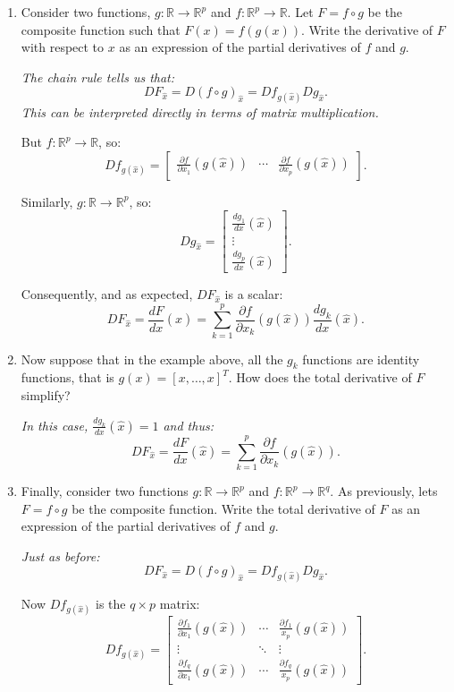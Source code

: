 \documentclass{article}
\newcommand{\R}{\ensuremath{\mathbb{R}}}
\begin{document}
\begin{enumerate}
	\item Consider two functions, $g:\R\rightarrow\R^p$ and $f:\R^p\rightarrow\R$. Let $F=f\circ g$ be the composite function such that $F(x)=f(g(x))$. Write the derivative of $F$ with respect to $x$ as an expression of the partial derivatives of $f$ and $g$.
	
	{\it The chain rule tells us that:
	$$DF_{\hat{x}} = D(f\circ g)_{\hat{x}} = Df_{g(\hat{x})} Dg_{\hat{x}}.$$
	This can be interpreted directly in terms of matrix multiplication.
	
	But $f:\R^p \rightarrow \R$, so:
	$$Df_{g(\hat{x})} = \left[\begin{array}{ccc}
	\frac{\partial f}{\partial x_1}(g(\hat{x})) &
	\cdots &
	\frac{\partial f}{\partial x_p}(g(\hat{x}))
	\end{array}\right].$$
	
	Similarly, $g:\R\rightarrow \R^p$, so:
	$$Dg_{\hat{x}} = \left[\begin{array}{c}
	\frac{dg_1}{dx}(\hat{x}) \\
	\vdots \\
	\frac{dg_p}{dx}(\hat{x})
	\end{array}\right].$$
	
	Consequently, and as expected, $DF_{\hat{x}}$ is a scalar:
	$$DF_{\hat{x}} = \frac{dF}{dx}(\hat{x}) = \sum_{k=1}^p \frac{\partial f}{\partial x_k}(g(\hat{x})) \frac{dg_k}{dx}(\hat{x}).$$
}
	
	\item Now suppose that in the example above, all the $g_k$ functions are identity functions, that is $g(x) = [x,\ldots, x]^T$. How does the total derivative of $F$ simplify?
	
	{\it
	In this case, $\frac{dg_k}{dx}(\hat{x}) = 1$ and thus:
	$$DF_{\hat{x}} = \frac{dF}{dx}(\hat{x}) = \sum_{k=1}^p \frac{\partial f}{\partial x_k}(g(\hat{x})).$$
	}
	
	\item Finally, consider two functions $g:\R\rightarrow \R^p$ and $f:\R^p\rightarrow \R^q$. As previously, lets $F=f\circ g$ be the composite function. Write the total derivative of $F$ as an expression of the partial derivatives of $f$ and $g$.
	
	{\it Just as before:
	$$DF_{\hat{x}} = D(f\circ g)_{\hat{x}} = Df_{g(\hat{x})} Dg_{\hat{x}}.$$
	
	Now $Df_{g(\hat{x})}$ is the $q\times p$ matrix:
	$$Df_{g(\hat{x})} = \left[\begin{array}{ccc}
	\frac{\partial f_1}{\partial x_1}(g(\hat{x})) & \cdots & \frac{\partial f_1}{x_p}(g(\hat{x}))\\
	\vdots & \ddots & \vdots \\
	\frac{\partial f_q}{\partial x_1}(g(\hat{x})) & \cdots & \frac{\partial f_q}{x_p}(g(\hat{x}))
	\end{array}\right].$$
	
}
\end{enumerate}
\end{document}
